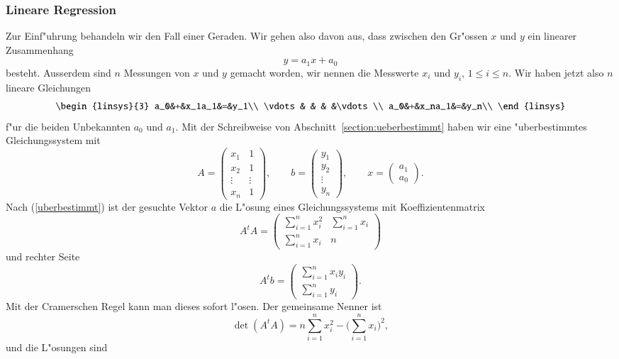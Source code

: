 \subsubsection{Lineare Regression}
Zur Einf"uhrung behandeln wir den Fall einer Geraden. Wir gehen also
davon aus, dass zwischen den Gr"ossen $x$ und $y$ ein linearer
Zusammenhang
\[
y=a_1x+a_0
\]
besteht. Ausserdem sind $n$ Messungen von $x$ und $y$ gemacht worden,
wir nennen die Messwerte $x_i$ und $y_i$, $1\le i\le n$. Wir haben 
jetzt also $n$ lineare Gleichungen
\[
\begin{linsys}{3}
a_0&+&x_1a_1&=&y_1\\
\vdots& &   & &\vdots\\
a_0&+&x_na_1&=&y_n\\
\end{linsys}
\]
f"ur die beiden Unbekannten $a_0$ und $a_1$.
Mit der Schreibweise von Abschnitt~\ref{section:ueberbestimmt} haben wir eine
"uberbestimmtes Gleichungssystem mit
\[
A=\begin{pmatrix}
x_1&1\\
x_2&1\\
\vdots&\vdots\\
x_n&1
\end{pmatrix},\qquad
b=\begin{pmatrix}
y_1\\y_2\\\vdots\\y_n
\end{pmatrix},\qquad
x=\begin{pmatrix}
a_1\\a_0
\end{pmatrix}.
\]
Nach (\ref{uberbestimmt}) ist der gesuchte Vektor $a$ die L"osung
eines Gleichungssystems mit Koeffizientenmatrix
\[
A^tA=\begin{pmatrix}
\sum_{i=1}^nx_i^2&\sum_{i=1}^nx_i\\
\sum_{i=1}^nx_i&n
\end{pmatrix}
\]
und rechter Seite
\[
A^tb=\begin{pmatrix}
\sum_{i=1}^nx_iy_i\\
\sum_{i=1}^ny_i
\end{pmatrix}.
\]
Mit der Cramerschen Regel kann man dieses sofort l"osen. Der gemeinsame
Nenner ist 
\[
\det(A^tA)=n\sum_{i=1}^nx_i^2-\biggl(\sum_{i=1}^nx_i\biggr)^2,
\]
und die L"osungen sind
